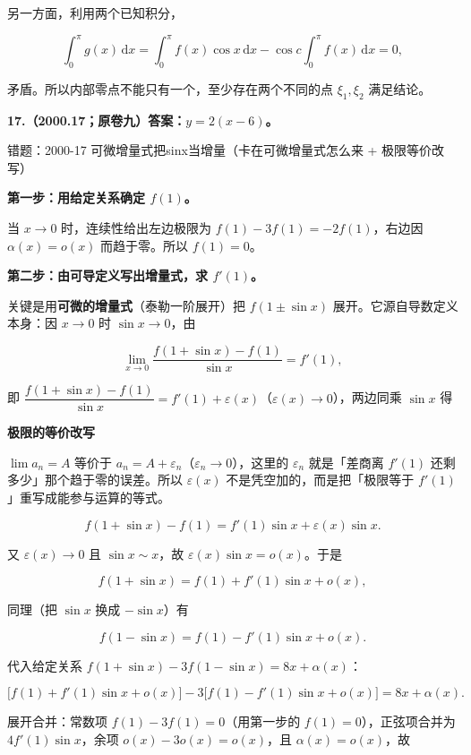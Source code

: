 \documentclass[UTF8,11pt,fontset=windows]{ctexart}
\begin{document}
另一方面，利用两个已知积分，

$$
\int_0^\pi g(x)\,\mathrm dx
=\int_0^\pi f(x)\cos x\,\mathrm dx
-\cos c\int_0^\pi f(x)\,\mathrm dx=0,
$$

矛盾。所以内部零点不能只有一个，至少存在两个不同的点 $\xi_1,\xi_2$ 满足结论。

\clearpage

\textbf{17.（2000.17；原卷九）答案：$y=2(x-6)$。}

\begingroup\color{gray}错题：2000-17 可微增量式把sinx当增量（卡在可微增量式怎么来 + 极限等价改写）\par\endgroup

\textbf{第一步：用给定关系确定 $f(1)$。}

当 $x\to0$ 时，连续性给出左边极限为 $f(1)-3f(1)=-2f(1)$，右边因 $\alpha(x)=o(x)$ 而趋于零。所以 $f(1)=0$。

\textbf{第二步：由可导定义写出增量式，求 $f'(1)$。}

关键是用\textbf{可微的增量式}（泰勒一阶展开）把 $f(1\pm\sin x)$ 展开。它源自导数定义本身：因 $x\to0$ 时 $\sin x\to0$，由

$$
\lim_{x\to0}\frac{f(1+\sin x)-f(1)}{\sin x}=f'(1),
$$

即 $\dfrac{f(1+\sin x)-f(1)}{\sin x}=f'(1)+\varepsilon(x)$（$\varepsilon(x)\to0$），两边同乘 $\sin x$ 得

{\bfseries 极限的等价改写\par}
$\lim a_n=A$ 等价于 $a_n=A+\varepsilon_n$（$\varepsilon_n\to0$），这里的 $\varepsilon_n$ 就是「差商离 $f'(1)$ 还剩多少」那个趋于零的误差。所以 $\varepsilon(x)$ 不是凭空加的，而是把「极限等于 $f'(1)$」重写成能参与运算的等式。

$$
f(1+\sin x)-f(1)=f'(1)\sin x+\varepsilon(x)\sin x.
$$

又 $\varepsilon(x)\to0$ 且 $\sin x\sim x$，故 $\varepsilon(x)\sin x=o(x)$。于是

$$
f(1+\sin x)=f(1)+f'(1)\sin x+o(x),
$$

同理（把 $\sin x$ 换成 $-\sin x$）有

$$
f(1-\sin x)=f(1)-f'(1)\sin x+o(x).
$$

代入给定关系 $f(1+\sin x)-3f(1-\sin x)=8x+\alpha(x)$：

$$
\big[f(1)+f'(1)\sin x+o(x)\big]-3\big[f(1)-f'(1)\sin x+o(x)\big]=8x+\alpha(x).
$$

展开合并：常数项 $f(1)-3f(1)=0$（用第一步的 $f(1)=0$），正弦项合并为 $4f'(1)\sin x$，余项 $o(x)-3o(x)=o(x)$，且 $\alpha(x)=o(x)$，故
\end{document}
